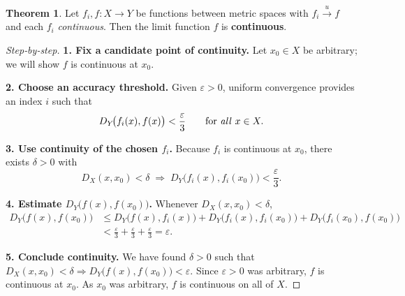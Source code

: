 \documentclass[12pt]{article}
\theoremstyle{definition} %
\newtheorem{theorem}{Theorem}
\theoremstyle{plain} %
\begin{document}
\begin{theorem}\label{thm:uniform_limit_continuous}
  Let $f_i,f:X\to Y$ be functions between metric spaces with
  $f_i\!\xrightarrow{\;u\;} f$ and each $f_i$ \emph{continuous}.
  Then the limit function $f$ is \textbf{continuous}.
\end{theorem}

\begin{proof}[Step‑by‑step]
  \textbf{1.  Fix a candidate point of continuity.}  
  Let $x_0\in X$ be arbitrary; we will show $f$ is continuous at $x_0$.

  \medskip
  \textbf{2.  Choose an accuracy threshold.}  
  Given $\varepsilon>0$,
  uniform convergence provides an index $i$ such that
  \[
      D_Y\!\bigl(f_i(x),f(x)\bigr)<\frac{\varepsilon}{3}
      \qquad\text{for \emph{all} }x\in X.
  \]

  \medskip
  \textbf{3.  Use continuity of the chosen $f_i$.}  
  Because $f_i$ is continuous at $x_0$, there exists $\delta>0$ with
  \[
      D_X(x,x_0)<\delta
      \;\Longrightarrow\;
      D_Y\!\bigl(f_i(x),f_i(x_0)\bigr)<\frac{\varepsilon}{3}.
  \]

  \medskip
  \textbf{4.  Estimate $D_Y\bigl(f(x),f(x_0)\bigr)$.}  
  Whenever $D_X(x,x_0)<\delta$,
  \begin{align*}
      D_Y\!\bigl(f(x),f(x_0)\bigr)
      &\le D_Y\!\bigl(f(x),f_i(x)\bigr)
           +D_Y\!\bigl(f_i(x),f_i(x_0)\bigr)
           +D_Y\!\bigl(f_i(x_0),f(x_0)\bigr)\\[4pt]
      &<\frac{\varepsilon}{3}+\frac{\varepsilon}{3}+\frac{\varepsilon}{3}
      =\varepsilon.
  \end{align*}

  \medskip
  \textbf{5.  Conclude continuity.}  
  We have found $\delta>0$ such that
  $D_X(x,x_0)<\delta \Rightarrow D_Y\bigl(f(x),f(x_0)\bigr)<\varepsilon$.
  Since $\varepsilon>0$ was arbitrary, $f$ is continuous at $x_0$.
  As $x_0$ was arbitrary, $f$ is continuous on all of $X$.
\end{proof}

\end{document}
